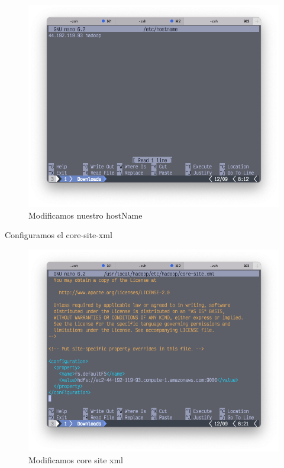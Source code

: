 \begin{figure}[h]
	\centering
	\includegraphics[scale=.35] {img/34-nano-etc-hostname}
	\caption{Modificamos nuestro hostName}
	\label{fig:34}	
\end{figure}
Configuramos el core-site-xml

\begin{figure}[h]
	\centering
	\includegraphics[scale=.35] {img/35-core-site-xml}
	\caption{Modificamos core site xml}
	\label{fig:35}	
\end{figure}

\clearpage

